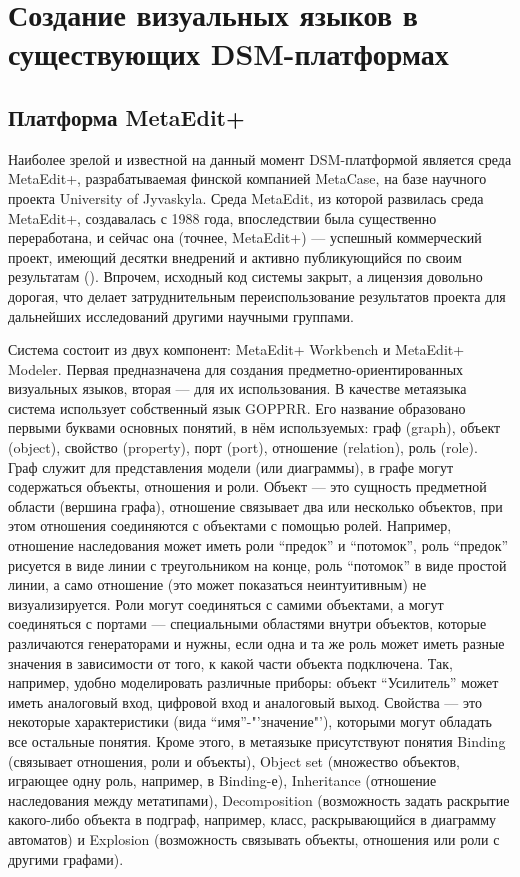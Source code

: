 \section{Создание визуальных языков в существующих DSM-платформах}
\subsection{Платформа MetaEdit+}
Наиболее зрелой и известной на данный момент DSM-платформой является среда MetaEdit+, 
разрабатываемая финской компанией MetaCase, на базе научного проекта University of Jyvaskyla. 
Среда MetaEdit, из которой развилась среда MetaEdit+, создавалась с 1988 года, впоследствии 
была существенно переработана, и сейчас она (точнее, MetaEdit+) --- успешный коммерческий проект, 
имеющий десятки внедрений и активно публикующийся по своим результатам (\cite{kelly2008domain, luoma2004defining, tolvanen2007advanced, tolvanen2009metaedit}). 
Впрочем, исходный код системы закрыт, а лицензия довольно дорогая, что делает затруднительным 
переиспользование результатов проекта для дальнейших исследований другими научными группами.

Система состоит из двух компонент: MetaEdit+ Workbench и MetaEdit+ Modeler. Первая 
предназначена для создания предметно-ориентированных визуальных языков, вторая --- для 
их использования. В качестве метаязыка система использует собственный язык GOPPRR. 
Его название образовано первыми буквами основных понятий, в нём используемых: граф (graph), 
объект (object), свойство (property), порт (port), отношение (relation), роль (role). 
Граф служит для представления модели (или диаграммы), в графе могут содержаться объекты, 
отношения и роли. Объект --- это сущность предметной области (вершина графа), отношение 
связывает два или несколько объектов, при этом отношения соединяются с объектами с помощью ролей. 
Например, отношение наследования может иметь роли "`предок"' и "`потомок"', роль "`предок"' 
рисуется в виде линии с треугольником на конце, роль "`потомок"' в виде простой линии, 
а само отношение (это может показаться неинтуитивным) не визуализируется. Роли могут 
соединяться с самими объектами, а могут соединяться с портами --- специальными областями 
внутри объектов, которые различаются генераторами и нужны, если одна и та же роль может 
иметь разные значения в зависимости от того, к какой части объекта подключена. Так, 
например, удобно моделировать различные приборы: объект "`Усилитель"' может иметь аналоговый 
вход, цифровой вход и аналоговый выход. Свойства --- это некоторые характеристики 
(вида "`имя"'-"'значение"'), которыми могут обладать все остальные понятия. Кроме 
этого, в метаязыке присутствуют понятия Binding (связывает отношения, роли и объекты),
Object set (множество объектов, играющее одну роль, например, в Binding-е), Inheritance 
(отношение наследования между метатипами), Decomposition (возможность задать раскрытие 
какого-либо объекта в подграф, например, класс, раскрывающийся в диаграмму автоматов) и 
Explosion (возможность связывать объекты, отношения или роли с другими графами).

